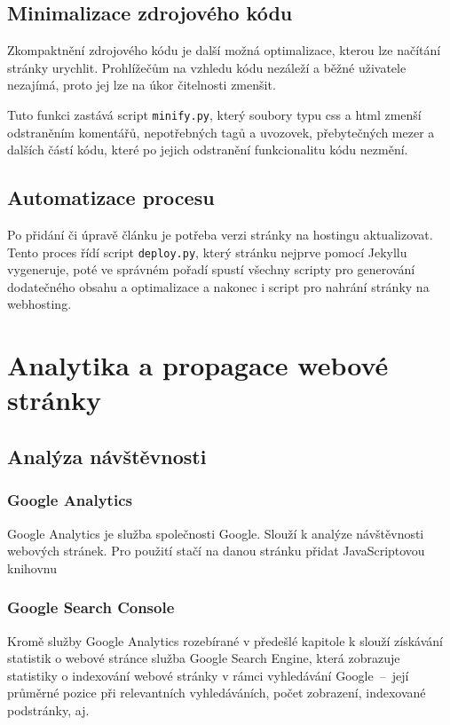 \documentclass[a4paper, 12pt]{article}
\begin{document}

  \subsection{Minimalizace zdrojového kódu}
  Zkompaktnění zdrojového kódu je další možná optimalizace, kterou lze načítání stránky urychlit. Prohlížečům na vzhledu kódu nezáleží a běžné uživatele nezajímá, proto jej lze na úkor čitelnosti zmenšit.

  Tuto funkci zastává script \texttt{minify.py}, který soubory typu \gls{css} a \gls{html} zmenší odstraněním komentářů, nepotřebných tagů a uvozovek, přebytečných mezer a dalších částí kódu, které po jejich odstranění funkcionalitu kódu nezmění.


  \subsection{Automatizace procesu}
  Po přidání či úpravě článku je potřeba verzi stránky na hostingu aktualizovat. Tento proces řídí script \texttt{deploy.py}, který stránku nejprve pomocí Jekyllu vygeneruje, poté ve správném pořadí spustí všechny scripty pro generování dodatečného obsahu a optimalizace a nakonec i script pro nahrání stránky na webhosting.


  \section{Analytika a propagace webové stránky}

  \subsection{Analýza návštěvnosti}

  \subsubsection{Google Analytics}
  Google Analytics je služba společnosti Google. Slouží k analýze návštěvnosti webových stránek. Pro použití stačí na danou stránku přidat JavaScriptovou knihovnu %



  \subsubsection{Google Search Console}
  Kromě služby Google Analytics rozebírané v předešlé kapitole k slouží získávání statistik o webové stránce služba Google Search Engine, která zobrazuje statistiky o indexování webové stránky v rámci vyhledávání Google~--~její průměrné pozice při relevantních vyhledáváních, počet zobrazení, indexované podstránky, aj.
\end{document}
